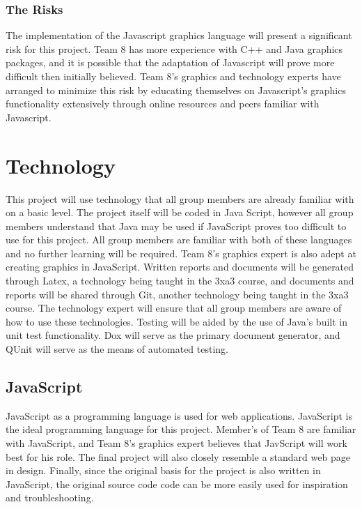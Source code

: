\documentclass{article}
\begin{document}
\subsubsection{The Risks}
The implementation of the Javascript graphics language will present a significant risk for this project. Team 8 has more experience with C++ and Java graphics packages, and it is possible that the adaptation of Javascript will prove more difficult then initially believed. Team 8's graphics and technology experts have arranged to minimize this risk by educating themselves on Javascript's graphics functionality extensively through online resources and peers familiar with Javascript.

\section{Technology}

This project will use technology that all group members are already familiar 
with on a basic level. The project itself will be coded in Java Script, however 
all group members understand that Java may be used if JavaScript proves too 
difficult to use for this project. All group members are familiar with both of 
these languages and no further learning will be required. Team 8's graphics 
expert is also adept at creating graphics in JavaScript. Written reports and 
documents will be generated through Latex, a technology being taught in the 3xa3 
course, and documents and reports will be shared through Git, another technology 
being taught in the 3xa3 course. The technology expert will ensure that all 
group members are aware of how to use these technologies. Testing will be aided 
by the use of Java’s built in unit test functionality. Dox will serve as the primary document generator, and QUnit will serve as the means of automated testing.

\subsection{JavaScript}

JavaScript as a programming language is used for web applications. JavaScript is the ideal programming language for this project. Member's of Team 8 are familiar with JavaScript, and Team 8's graphics 
expert believes that JavScript will work best for his role. The final project will also closely 
resemble a standard web page in design. Finally, since the original basis for the 
project is also written in JavaScript, the original source code code can be more easily used for 
inspiration and troubleshooting.
\end{document}

